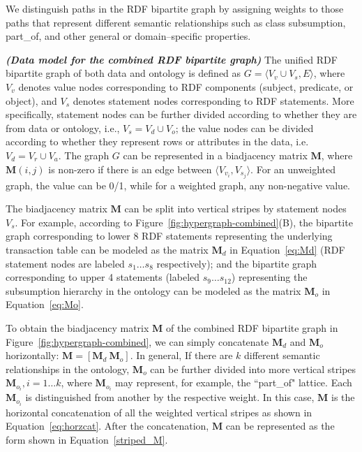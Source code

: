We distinguish paths in the RDF bipartite graph by assigning weights to those paths that represent different semantic relationships such as class subsumption, part\_of, and other general or domain--specific properties.

\begin{mydef}
\emph{\textbf{(Data model for the combined RDF bipartite graph)}} The unified RDF bipartite graph of both data and ontology is defined as $G=\langle V_v \cup V_s, E \rangle$, where $V_v$ denotes value nodes corresponding to RDF components (subject, predicate, or object), and $V_s$ denotes statement nodes corresponding to RDF statements. More specifically, statement nodes can be further divided according to whether they are from data or ontology, i.e., $V_s=V_d \cup V_o$; the value nodes can be divided according to whether they represent rows or attributes in the data, i.e. $V_d=V_r \cup V_a$. The graph $G$ can be represented in a biadjacency matrix $\mathbf{M}$, where $\mathbf{M}(i,j)$ is non-zero if there is an edge between $\langle V_{v_i}, V_{s_j} \rangle$. For an unweighted graph, the value can be 0/1, while for a weighted graph, any non-negative value.
\end{mydef}

The biadjacency matrix $\mathbf{M}$ can be split into vertical stripes by statement nodes $V_s$. For example, according to Figure~\ref{fig:hypergraph-combined}(B), the bipartite graph corresponding to lower 8 RDF statements representing the underlying transaction table can be modeled as the matrix $\mathbf{M}_d$ in Equation~\ref{eq:Md} (RDF statement nodes are labeled $s_1\dots s_8$ respectively); and the bipartite graph corresponding to upper 4 statements (labeled $s_9\dots s_{12}$) representing the subsumption hierarchy in the ontology can be modeled as the matrix $\mathbf{M}_o$ in Equation~\ref{eq:Mo}.

To obtain the biadjacency matrix $\mathbf{M}$ of the combined RDF bipartite graph in Figure~\ref{fig:hypergraph-combined}, we can simply concatenate $\mathbf{M}_d$ and $\mathbf{M}_o$ horizontally: $\mathbf{M}=\left[\mathbf{M}_d~\mathbf{M}_o\right]$. In general, If there are $k$ different semantic relationships in the ontology, $\mathbf{M}_o$ can be further divided into more vertical stripes $\mathbf{M}_{o_i}, i=1\dots k$, where $\mathbf{M}_{o_i}$ may represent, for example, the ``part\_of" lattice. Each $\mathbf{M}_{o_i}$ is  distinguished from another by the respective weight. In this case, $\mathbf{M}$ is the horizontal concatenation of all the weighted vertical stripes as shown in Equation~\ref{eq:horzcat}. After the concatenation, $\mathbf{M}$ can be represented as the form shown in Equation~\ref{striped_M}.

